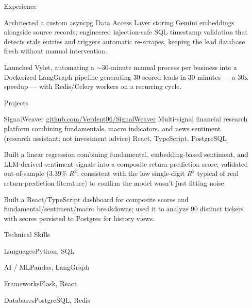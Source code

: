 \documentclass[
	11pt
]{../../../template}
\begin{document}
\begin{rSection}{E}{xperience}
\begin{rSectionEntry}
			\item Architected a custom asyncpg Data Access Layer storing Gemini embeddings alongside source records; engineered injection-safe SQL timestamp validation that detects stale entries and triggers automatic re-scrapes, keeping the lead database fresh without manual intervention.
			\item Launched Vylet, automating a $\sim$30-minute manual process per business into a Dockerized LangGraph pipeline generating 30 scored leads in 30 minutes --- a 30x speedup --- with Redis/Celery workers on a recurring cycle.
		\end{rSectionEntry}
	\end{rSection}

	\begin{rSection}{P}{rojects}
		\begin{rSectionEntry}
			{SignalWeaver}
			{\href{https://github.com/Verdent06/SignalWeaver}{github.com/Verdent06/SignalWeaver}}
			{Multi-signal financial research platform combining fundamentals, macro indicators, and news sentiment (research assistant; not investment advice)}
			{React, TypeScript, PostgreSQL}
			{}

			\item Built a linear regression combining fundamental, embedding-based sentiment, and LLM-derived sentiment signals into a composite return-prediction score; validated out-of-sample (3.39\% $R^{2}$, consistent with the low single-digit $R^{2}$ typical of real return-prediction literature) to confirm the model wasn't just fitting noise.
			\item Built a React/TypeScript dashboard for composite scores and fundamental/sentiment/macro breakdowns; used it to analyze 90 distinct tickers with scores persisted to Postgres for history views.
		\end{rSectionEntry}
	\end{rSection}

	\begin{rSection}{T}{echnical Skills}
		\begin{rSet}{Languages}{Python, SQL}
		\end{rSet}
		\begin{rSet}{AI / ML}{Pandas, LangGraph}
		\end{rSet}
		\begin{rSet}{Frameworks}{Flask, React}
		\end{rSet}
		\begin{rSet}{Databases}{PostgreSQL, Redis}
		\end{rSet}
	\end{rSection}
\end{document}
